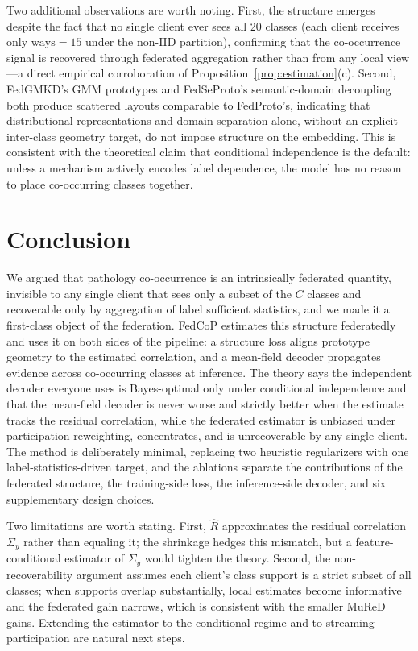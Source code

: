 \documentclass[11pt,a4paper]{article}
\theoremstyle{definition}
\newcommand{\Rhat}{\widehat{R}}
\newcommand{\Sigmay}{\Sigma_{y}}
\begin{document}
Two additional observations are worth noting. First, the structure emerges despite the fact that no single client ever sees all 20 classes (each client receives only $\text{ways}=15$ under the non-IID partition), confirming that the co-occurrence signal is recovered through federated aggregation rather than from any local view---a direct empirical corroboration of Proposition~\ref{prop:estimation}(c). Second, FedGMKD's GMM prototypes and FedSeProto's semantic-domain decoupling both produce scattered layouts comparable to FedProto's, indicating that distributional representations and domain separation alone, without an explicit inter-class geometry target, do not impose structure on the embedding. This is consistent with the theoretical claim that conditional independence is the default: unless a mechanism actively encodes label dependence, the model has no reason to place co-occurring classes together.

\section{Conclusion}
\label{sec:conclusion}

We argued that pathology co-occurrence is an intrinsically federated quantity, invisible to any single client that sees only a subset of the $C$ classes and recoverable only by aggregation of label sufficient statistics, and we made it a first-class object of the federation. FedCoP estimates this structure federatedly and uses it on both sides of the pipeline: a structure loss aligns prototype geometry to the estimated correlation, and a mean-field decoder propagates evidence across co-occurring classes at inference. The theory says the independent decoder everyone uses is Bayes-optimal only under conditional independence and that the mean-field decoder is never worse and strictly better when the estimate tracks the residual correlation, while the federated estimator is unbiased under participation reweighting, concentrates, and is unrecoverable by any single client. The method is deliberately minimal, replacing two heuristic regularizers with one label-statistics-driven target, and the ablations separate the contributions of the federated structure, the training-side loss, the inference-side decoder, and six supplementary design choices.

Two limitations are worth stating. First, $\Rhat$ approximates the residual correlation $\Sigmay$ rather than equaling it; the shrinkage hedges this mismatch, but a feature-conditional estimator of $\Sigmay$ would tighten the theory. Second, the non-recoverability argument assumes each client's class support is a strict subset of all classes; when supports overlap substantially, local estimates become informative and the federated gain narrows, which is consistent with the smaller MuReD gains. Extending the estimator to the conditional regime and to streaming participation are natural next steps.
\end{document}
